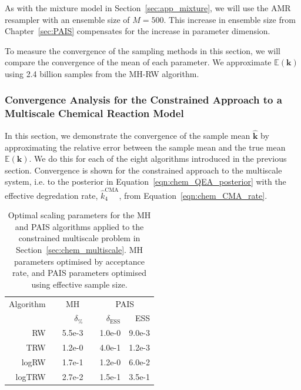 \documentclass[final]{siamltex}
\begin{document}
As with the mixture model in Section~\ref{sec:app_mixture}, we will use the AMR resampler with an ensemble size of $M=500$. This increase in ensemble size from Chapter~\ref{sec:PAIS} compensates for the increase in parameter dimension.

To measure the convergence of the sampling methods in this section, we will compare the convergence of the mean of each parameter. We approximate $\mathbb{E}(\mathbf{k})$ using 2.4 billion samples from the MH-RW algorithm.

\subsubsection{Convergence Analysis for the Constrained Approach to a Multiscale Chemical Reaction Model}\label{sec:chem_conv}

In this section, we demonstrate the convergence of the sample mean $\hat{\mathbf{k}}$ by approximating the relative error between the sample mean and the true mean $\mathbb{E}(\mathbf{k})$. We do this for each of the eight algorithms introduced in the previous section. Convergence is shown for the constrained approach to the multiscale system, i.e. to the posterior in Equation~\eqref{eqn:chem_QEA_posterior} with the effective degredation rate, $\hat{k}_4^{\text{CMA}}$, from Equation~\eqref{eqn:chem_CMA_rate}.

\begin{table}[!h]
\centering
\begin{tabular}{rrrrrr}
\toprule
	\multicolumn{1}{l}{Algorithm} & \multicolumn{3}{c}{MH} & \multicolumn{2}{c}{PAIS} \\ \cmidrule(lr){2-4} \cmidrule(lr){5-6}
	& & $\delta_\%$ & & $\delta_{\text{ESS}}$ & ESS \\ \midrule
	RW & & 5.5e-3 & & 1.0e-0 & 9.0e-3 \\
	TRW & & 1.2e-0 & & 4.0e-1 & 1.2e-3 \\
	logRW & & 1.7e-1 & & 1.2e-0 & 6.0e-2 \\
	logTRW & & 2.7e-2 & & 1.5e-1 & 3.5e-1 \\
\bottomrule
\end{tabular}
\caption{Optimal scaling parameters for the MH and PAIS algorithms applied to the constrained multiscale problem in Section~\ref{sec:chem_multiscale}. MH parameters optimised by acceptance rate, and PAIS parameters optimised using effective sample size.}
\label{tab:chem_multiscale_scaling}
\end{table}
\end{document}
